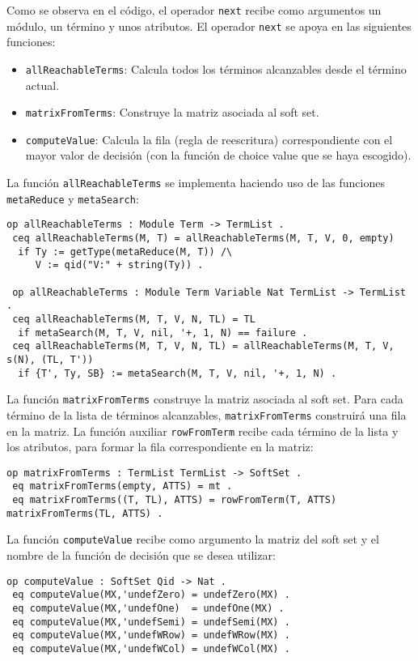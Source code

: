 \noindent
Como se observa en el código, el operador \texttt{next} recibe como argumentos un módulo, un término y unos atributos.
El operador \texttt{next} se apoya en las siguientes funciones:
\begin{itemize}
\item \texttt{allReachableTerms}: Calcula todos los términos alcanzables desde el término actual.
\item \texttt{matrixFromTerms}: Construye la matriz asociada al soft set.
\item \texttt{computeValue}: Calcula la fila (regla de reescritura) correspondiente con el mayor valor de decisión (con la función de choice value que se haya escogido).
\end{itemize}
\medskip

La función \texttt{allReachableTerms} se implementa haciendo uso de las funciones \texttt{metaReduce} y \texttt{metaSearch}:
\begin{lstlisting}[language=Maude]
 op allReachableTerms : Module Term -> TermList .
 ceq allReachableTerms(M, T) = allReachableTerms(M, T, V, 0, empty)
  if Ty := getType(metaReduce(M, T)) /\
     V := qid("V:" + string(Ty)) .

 op allReachableTerms : Module Term Variable Nat TermList -> TermList .
 ceq allReachableTerms(M, T, V, N, TL) = TL
  if metaSearch(M, T, V, nil, '+, 1, N) == failure .
 ceq allReachableTerms(M, T, V, N, TL) = allReachableTerms(M, T, V, s(N), (TL, T'))
  if {T', Ty, SB} := metaSearch(M, T, V, nil, '+, 1, N) .
\end{lstlisting}
\smallskip

La función \texttt{matrixFromTerms} construye la matriz asociada al soft set.
Para cada término de la lista de términos alcanzables, \texttt{matrixFromTerms} construirá una fila en la matriz.
La función auxiliar \texttt{rowFromTerm} recibe cada término de la lista  y los atributos, para formar la fila correspondiente en la matriz:
\begin{lstlisting}[language=Maude]
 op matrixFromTerms : TermList TermList -> SoftSet .
 eq matrixFromTerms(empty, ATTS) = mt .
 eq matrixFromTerms((T, TL), ATTS) = rowFromTerm(T, ATTS) matrixFromTerms(TL, ATTS) .
\end{lstlisting}
\smallskip


La función \texttt{computeValue} recibe como argumento la matriz del soft set y el nombre de la función de decisión que se desea utilizar:
\begin{lstlisting}[language=Maude]
 op computeValue : SoftSet Qid -> Nat .
 eq computeValue(MX,'undefZero) = undefZero(MX) .
 eq computeValue(MX,'undefOne)  = undefOne(MX) .
 eq computeValue(MX,'undefSemi) = undefSemi(MX) .
 eq computeValue(MX,'undefWRow) = undefWRow(MX) .
 eq computeValue(MX,'undefWCol) = undefWCol(MX) .
\end{lstlisting}
\smallskip



